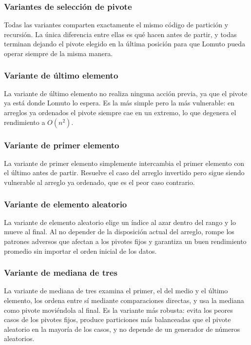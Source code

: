 \subsubsection{Variantes de selección de pivote}
Todas las variantes comparten exactamente el mismo código de partición y recursión. La única diferencia entre ellas es qué hacen antes de partir, y todas terminan dejando el pivote elegido en la última posición para que Lomuto pueda operar siempre de la misma manera.

\subsubsection{Variante de último elemento}
La variante de último elemento no realiza ninguna acción previa, ya que el pivote ya está donde Lomuto lo espera. Es la más simple pero la más vulnerable: en arreglos ya ordenados el pivote siempre cae en un extremo, lo que degenera el rendimiento a $O(n^2)$.

\subsubsection{Variante de primer elemento}
La variante de primer elemento simplemente intercambia el primer elemento con el último antes de partir. Resuelve el caso del arreglo invertido pero sigue siendo vulnerable al arreglo ya ordenado, que es el peor caso contrario.

\subsubsection{Variante de elemento aleatorio}
La variante de elemento aleatorio elige un índice al azar dentro del rango y lo mueve al final. Al no depender de la disposición actual del arreglo, rompe los patrones adversos que afectan a los pivotes fijos y garantiza un buen rendimiento promedio sin importar el orden inicial de los datos.

\subsubsection{Variante de mediana de tres}
La variante de mediana de tres examina el primer, el del medio y el último elemento, los ordena entre sí mediante comparaciones directas, y usa la mediana como pivote moviéndola al final. Es la variante más robusta: evita los peores casos de los pivotes fijos, produce particiones más balanceadas que el pivote aleatorio en la mayoría de los casos, y no depende de un generador de números aleatorios.

